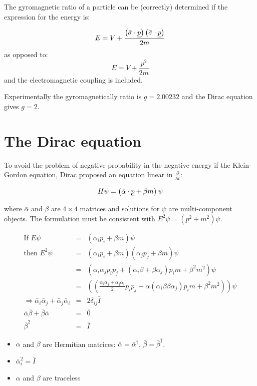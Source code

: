 The gyromagnetic ratio of a particle can be (correctly) determined if the expression for the energy is:

\[
  E = V + \frac{\left(\bar{\sigma}\cdot\underline{p}\right)\left(\bar{\sigma}\cdot\underline{p}\right)}{2m}
\]
as opposed to:
\[
  E = V + \frac{p^2}{2m}
\]
and the electromagnetic coupling is included.

Experimentally the gyromagnetically ratio is $g = 2.00232$ and the Dirac equation gives $g = 2$.

\section{The Dirac equation}

To avoid the problem of negative probability in the negative energy if the Klein-Gordon equation, Dirac proposed an equation linear in $\frac{\partial}{\partial t}$:

\[
  H\psi = \left(\bar{\alpha}\cdot\underline{p} + \beta m\right)\psi
\]

where $\bar{\alpha}$ and $\beta$ are $4\times 4$ matrices and solutions for $\psi$ are multi-component objects.  The formulation must be consistent with $E^2\psi = \left(p^2 + m^2\right)\psi$.

\begin{eqnarray*}
  \textrm{If } E\psi & = & \left(\alpha_ip_i + \beta m\right)\psi \\
  \textrm{then } E^2\psi & = & \left(\alpha_ip_i + \beta m\right)\left(\alpha_j p_j + \beta m\right)\psi \\
  & = & \left(\alpha_i\alpha_jp_ip_j + \left(\alpha_i\beta + \beta\alpha_j\right)p_im + \beta^2m^2\right)\psi \\
  & = & \left( \left(\frac{\alpha_i\alpha_j + \alpha_j\alpha_i}{2}p_ip_j + \alpha\left(\alpha_i\beta \beta\alpha_j\right)p_im + \beta^2m^2\right)\right)\psi \\
  \Rightarrow \bar{\alpha}_i\bar{\alpha}_j + \bar{\alpha}_j\bar{\alpha}_i & = & 2\delta_{ij}\bar{I} \\
  \bar{\alpha}\bar{\beta} + \bar{\beta}\bar{\alpha} & = & \bar{0} \\
  \bar{\beta}^2 & = & \bar{I}
\end{eqnarray*}

\begin{itemize}
  \item $\alpha$ and $\beta$ are Hermitian matrices: $\bar{\alpha} = \bar{\alpha}^{\dagger}$, $\bar{\beta} = \bar{\beta}^{\dagger}$.
  \item $\bar{\alpha}_i^2 = \bar{I}$
  \item $\alpha$ and $\beta$ are traceless
\end{itemize}


